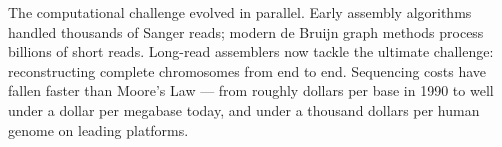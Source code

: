 \begin{historical}
The computational challenge evolved in parallel. Early assembly algorithms handled thousands of Sanger reads; modern de Bruijn graph methods process billions of short reads. Long-read assemblers now tackle the ultimate challenge: reconstructing complete chromosomes from end to end. Sequencing costs have fallen faster than Moore's Law — from roughly dollars per base in 1990 to well under a dollar per megabase today, and under a thousand dollars per human genome on leading platforms.

\end{historical}
